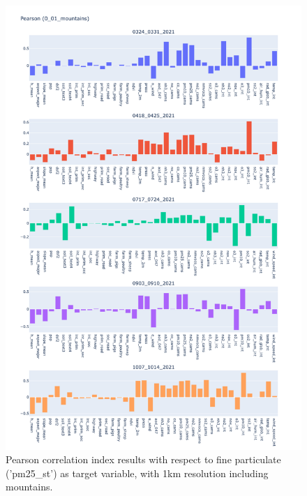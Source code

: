 \begin{figure}[H]
    \centering
    \includegraphics[scale=0.35]{images/tests/0_01_mountainspm25_st_pearson.png}
    \caption{Pearson correlation index results with respect to fine particulate ('pm25\_st') as target variable, with 1km resolution including mountains.}
    \label{fig:overview}
\end{figure}
